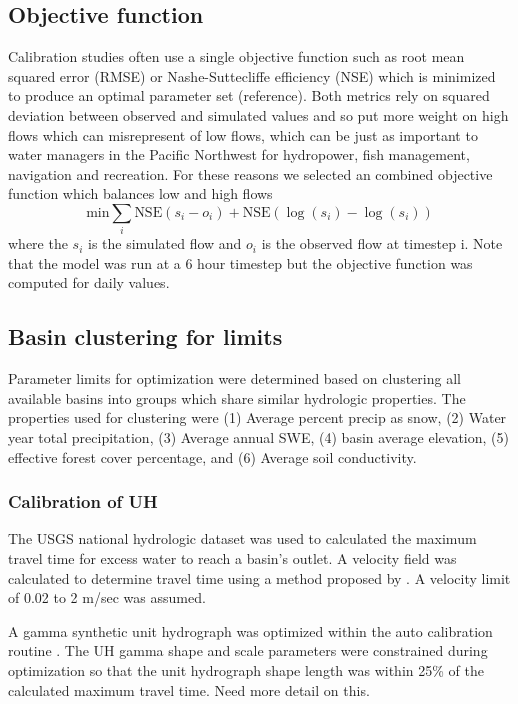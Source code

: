 \documentclass{agujournal2019}
\begin{document}
\subsection{Objective function}
Calibration studies often use a single objective function such as root mean squared error (RMSE) or Nashe-Suttecliffe efficiency (NSE) which is minimized to produce an optimal parameter set (reference). Both metrics rely on squared deviation between observed and simulated values and so put more weight on high flows which can misrepresent of low flows, which can be just as important to water managers in the Pacific Northwest for hydropower, fish management, navigation and recreation. For these reasons we selected an combined objective function which balances low and high flows
$$\text{min} \sum_i \text{NSE}(s_i-o_i)+\text{NSE}(\log(s_i)-\log(s_i))$$
where the $s_i$ is the simulated flow and $o_i$ is the observed flow at timestep i. Note that the model was run at a 6 hour timestep but the objective function was computed for daily values. 

\subsection{Basin clustering for limits}

Parameter limits for optimization were determined based on clustering all available basins into groups which share similar hydrologic properties. The properties used for clustering were (1) Average percent precip as snow, (2) Water year total precipitation, (3) Average annual SWE, (4) basin average elevation, (5) effective forest cover percentage, and (6) Average soil conductivity. 

\subsubsection{Calibration of UH}

The USGS national hydrologic dataset was used to calculated the maximum travel time for excess water to reach a basin's outlet. A velocity field was calculated to determine travel time using a method proposed by . A velocity limit of 0.02 to 2 m/sec was assumed. 

A gamma synthetic unit hydrograph was optimized within the auto calibration routine \cite{Croley_1980}. The UH gamma shape and scale parameters were constrained during optimization so that the unit hydrograph shape length was within 25\% of the calculated maximum travel time. {Need more detail on this.}
\end{document}
